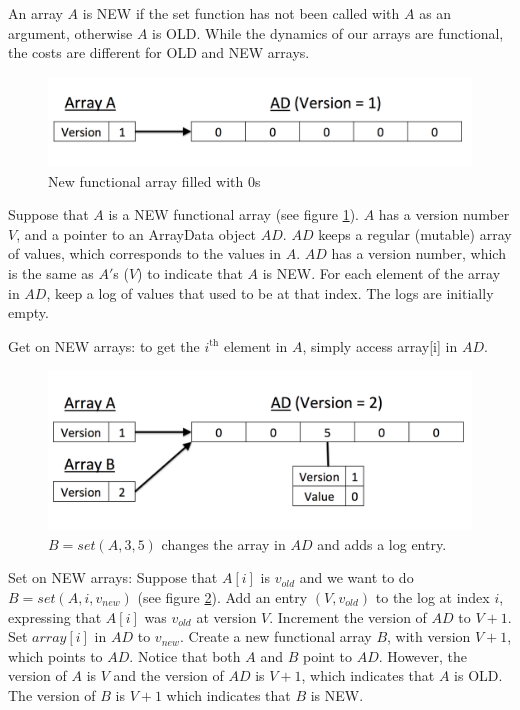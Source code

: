 \documentclass[preprint]{sigplanconf}
\begin{document}
An array $A$ is NEW if the set function has not been called with $A$ as an argument, otherwise $A$ is OLD. While the dynamics of our arrays are functional, the costs are different for OLD and NEW arrays. 

\begin{figure}[!ht]
\centering
\includegraphics[scale=0.3]{new_array_A}
\nocaptionrule \caption{New functional array filled with 0s}
\label{fig:new_array_A}
\end{figure}

Suppose that $A$ is a NEW functional array  (see figure \ref{fig:new_array_A}). $A$ has a version number $V$, and a pointer to an ArrayData object $AD$. $AD$ keeps a regular (mutable) array of values, which corresponds to the values in $A$. $AD$ has a version number, which is the same as $A'$s ($V$) to indicate that $A$ is NEW. For each element of the array in $AD$, keep a log of values that used to be at that index. The logs are initially empty.

Get on NEW arrays: to get the $i^{\text{th}}$ element in $A$, simply access array[i] in $AD$.

\begin{figure}[!ht]
\centering
\includegraphics[scale=0.3]{set_A_return_B}
\nocaptionrule \caption{$B = set(A, 3, 5)$ changes the array in $AD$ and adds a log entry.}
\label{fig:set_A_return_B}
\end{figure}

Set on NEW arrays: Suppose that $A[i]$ is $v_{old}$ and we want to do $B = set(A, i, v_{new})$ (see figure \ref{fig:set_A_return_B}). Add an entry $(V, v_{old})$ to the log at index $i$, expressing that $A[i]$ was $v_{old}$ at version $V$. Increment the version of $AD$ to $V+1$. Set $array[i]$ in $AD$ to $v_{new}$. Create a new functional array $B$, with version $V+1$, which points to $AD$. Notice that both $A$ and $B$ point to $AD$. However, the version of $A$ is $V$ and the version of $AD$ is $V+1$, which indicates that $A$ is OLD. The version of $B$ is $V+1$ which indicates that $B$ is NEW.
\end{document}
